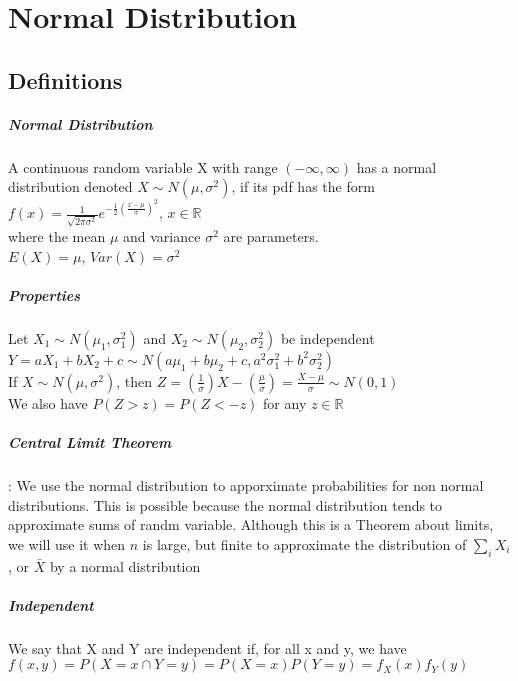 \chapter{Normal Distribution}
  \section{Definitions}
    \paragraph{Normal Distribution} A continuous random variable X with range
      $(-\infty, \infty)$ has a normal distribution denoted $X \sim N(\mu,
      \sigma^2)$, if its pdf has the form $f(x) = \frac{1}{\sqrt{2\pi
      \sigma^2}}e^{-\frac{1}{2}(\frac{x-\mu}{\sigma})^2}$, $x \in \mathbb{R}$\\
      where the mean $\mu$ and variance $\sigma^2$ are parameters. \\
      $E(X) = \mu$, $Var(X) = \sigma^2$

    \paragraph{Properties}
      Let $X_1 \sim N(\mu_1, \sigma^2_1)$ and $X_2 \sim N(\mu_2, \sigma^2_2)$
      be independent\\
      $Y = aX_1 + bX_2 + c \sim N(a\mu_1 + b\mu_2 + c, a^2\sigma_1^2 +
      b^2\sigma^2_2)$\\
      If $X \sim N(\mu, \sigma^2)$, then $Z = (\frac{1}{\sigma})X -
      (\frac{\mu}{\sigma}) = \frac{X-\mu}{\sigma} \sim N(0, 1)$\\
      We also have $P(Z > z) = P(Z < -z)$ for any $z \in \mathbb{R}$

    \paragraph{Central Limit Theorem} : We use the normal distribution to
    apporximate probabilities for non normal distributions. This is possible
    because the normal distribution tends to approximate sums of randm
    variable. Although this is a Theorem about limits, we will use it when $n$
    is large, but finite to approximate the distribution of $\sum_i X_i$, or
    $\bar{X}$ by a normal distribution

    \paragraph{Independent} We say that X and Y are independent if, for all x
    and y, we have \\
    $f(x, y) = P(X = x \cap Y = y) = P(X = x)P(Y=y) = f_X(x)f_Y(y)$

